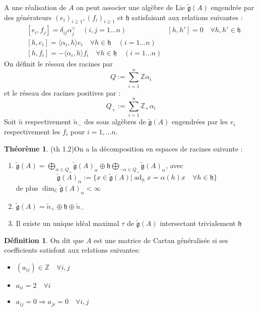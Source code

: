\documentclass[12pt]{article}
\DeclareMathOperator{\ad}{ad}
\theoremstyle{definition}
\newtheorem{theo}{Théorème}[section]
\newtheorem{Def}{Définition}[section]
\begin{document}
 A une réalisation de $A$ on peut associer une algèbre de Lie $\tilde{\mathfrak{g}}(A)$ engendrée par des générateurs $(e_i)_{i\geqslant 1},(f_i)_{i\geqslant 1}$ et $\mathfrak{h}$ satisfaisant aux relations suivantes :
\begin{align}
& [e_i,f_j]=\delta_{ij}\alpha_j^{\vee}\quad (i,j=1...n)
&[h,h']=0\quad\forall h,h'\in\mathfrak{h}\\
& [h,e_i]=\langle\alpha_i,h\rangle e_i\quad\forall h\in\mathfrak{h}\quad (i=1...n)\\ 
&[h,f_i]=-\langle\alpha_i, h\rangle f_i\quad\forall h\in\mathfrak{h}\quad (i=1...n)
\end{align}
On définit le réseau des racines par $$Q:=\underset{i=1}{\overset{n}{\sum}}\mathbb{Z}\alpha_i$$ et le réseau des racines positives par : $$Q_+:=\underset{i=1}{\overset{n}{\sum}}\mathbb{Z}_+\alpha_i$$
Soit $\tilde{n}$ respectivement $\tilde{n}_-$ des sous algèbres de $\tilde{\mathfrak{g}}(A)$ engendrées par les $e_i$ respectivement les $f_i$ pour $i=1,...n$.
\begin{theo}\cite{Kac}(th 1.2)On a la décomposition en espaces de racines suivante :\begin{enumerate}
\item $\tilde{\mathfrak{g}}(A)=\underset{\alpha\in Q_+}{\bigoplus}\tilde{\mathfrak{g}}(A)_{\alpha}\oplus\mathfrak{h}\underset{-\alpha\in Q_+}{\bigoplus}\tilde{\mathfrak{g}}(A)_{\alpha}$, avec $$\tilde{\mathfrak{g}}(A)_{\alpha}:=\{x\in\tilde{\mathfrak{g}}(A)\vert \ad_hx=\alpha(h)x\quad\forall h\in\mathfrak{h}\}$$ de plus $\dim_{\mathbb{C}}\tilde{\mathfrak{g}}(A)_{\alpha}<\infty$ %
\item $\tilde{\mathfrak{g}}(A)=\tilde{n}_+\oplus \mathfrak{h}\oplus \tilde{n}_-$ 
\item Il existe un unique idéal maximal $\tau$ de $\tilde{\mathfrak{g}}(A)$ intersectant trivialement $\mathfrak{h}$
\end{enumerate}
\end{theo}
\begin{Def} On dit que $A$ est une matrice de Cartan généralisée si ses coefficients satisfont aux relations suivantes:
\begin{itemize}
\item $(a_{ij})\in\mathbb{Z}\quad\forall i,j$
\item $a_{ii}=2\quad\forall i$
\item $a_{ij}=0\Rightarrow a_{ji}=0\quad\forall i,j$
\end{itemize}
\end{Def}
\end{document}
